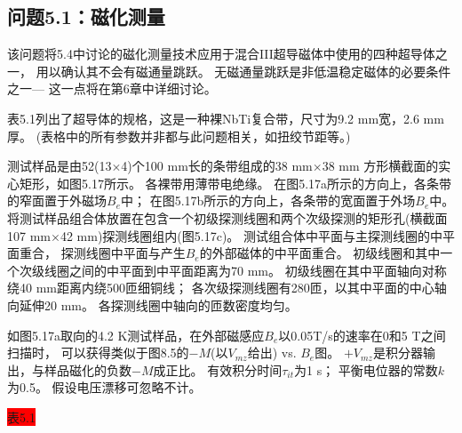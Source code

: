 \subsection{问题5.1：磁化测量}
该问题将5.4中讨论的磁化测量技术应用于混合III超导磁体中使用的四种超导体之一，
用以确认其不会有磁通量跳跃。
无磁通量跳跃是非低温稳定磁体的必要条件之一--- 这一点将在第6章中详细讨论。

表5.1列出了超导体的规格，这是一种裸NbTi复合带，尺寸为9.2 mm宽，2.6 mm厚。
(表格中的所有参数并非都与此问题相关，如扭绞节距等。)

测试样品是由52(13$\times$4)个100 mm长的条带组成的38 mm$\times$38 mm 方形横截面的实心矩形，如图5.17所示。
各裸带用薄带电绝缘。
在图5.17a所示的方向上，各条带的窄面置于外磁场$B_e$中；
在图5.17b所示的方向上，各条带的宽面置于外场$B_e$中。
将测试样品组合体放置在包含一个初级探测线圈和两个次级探测的矩形孔(横截面107 mm$\times$42 mm)探测线圈组内(图5.17c)。
测试组合体中平面与主探测线圈的中平面重合，
探测线圈中平面与产生$B_e$的外部磁体的中平面重合。
初级线圈和其中一个次级线圈之间的中平面到中平面距离为70 mm。
初级线圈在其中平面轴向对称绕40 mm距离内绕500匝细铜线；
各次级探测线圈有280匝，以其中平面的中心轴向延伸20 mm。
各探测线圈中轴向的匝数密度均匀。

如图5.17a取向的4.2 K测试样品，在外部磁感应$B_e$以0.05T/s的速率在0和5 T之间扫描时，
可以获得类似于图8.5的$-M$(以$V_{mz}$给出) vs. $B_e$图。
$+V_{mz}$是积分器输出，与样品磁化的负数$-M$成正比。
有效积分时间$\tau_{it}$为1 s；
平衡电位器的常数$k$为0.5。
假设电压漂移可忽略不计。

\colorbox{red}{表5.1}


